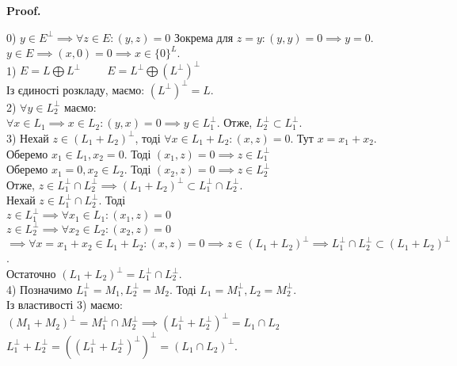 \documentclass[a4paper, 10pt]{article}
\makeatletter
\def\qed{$\blacksquare$}
\theoremstyle{theoremdd}
\theoremstyle{theoremdd}
\theoremstyle{theoremdd}
\theoremstyle{theoremdd}
\theoremstyle{theoremdd}
\theoremstyle{theoremdd}
\theoremstyle{theoremdd}
\theoremstyle{theoremdd}
\renewenvironment{proof}[1][Proof.\\]{\par
\pushQED{\hfill \qed}%
\normalfont \topsep6\p@\@plus6\p@\relax
\trivlist
\item\relax
{\bfseries
#1\@addpunct{.}}\hspace\labelsep\ignorespaces
}{%
\popQED\endtrivlist\@endpefalse
}
\makeatother
\begin{document}
\begin{proof}
0) $y \in E^{\perp} \implies \forall z \in E: (y,z) = 0$ Зокрема для $z = y: (y,y) = 0 \implies y = 0$.\\
$y \in E \implies (x,0) = 0 \implies x \in \{0\}^L$.
\bigskip \\
1) $E = L \bigoplus L^{\perp} \hspace{1cm} E = L^{\perp} \bigoplus (L^{\perp})^{\perp}$\\
Із єдиності розкладу, маємо: $(L^{\perp})^{\perp} = L$.
\bigskip \\
2) $\forall y \in L_2^{\perp}$ маємо:\\
$\forall x \in L_1 \implies x \in L_2: (y,x) = 0 \implies y \in L_1^{\perp}$. Отже, $L_2^{\perp} \subset L_1^{\perp}$.
\bigskip \\

3) Нехай $z \in (L_1+L_2)^\perp$, тоді $\forall x \in L_1+L_2: (x,z) = 0$. Тут $x = x_1 + x_2$. \\
Оберемо $x_1 \in L_1, x_2 = 0$. Тоді $(x_1,z) = 0 \implies z \in L_1^\perp$\\
Оберемо $x_1 = 0, x_2 \in L_2$. Тоді $(x_2,z) = 0 \implies z \in L_2^\perp$\\
Отже, $z \in L_1^\perp \cap L_2^\perp \implies (L_1+L_2)^\perp \subset L_1^\perp \cap L_2^\perp$.\\
Нехай $z \in L_1^\perp \cap L_2^\perp$. Тоді\\
$z \in L_1^\perp \implies \forall x_1 \in L_1: (x_1,z) = 0$\\
$z \in L_2^\perp \implies \forall x_2 \in L_2: (x_2,z) = 0$\\
$\implies \forall x = x_1+x_2 \in L_1+L_2: (x,z) = 0 \implies z \in (L_1+L_2)^\perp \implies L_1^\perp \cap L_2^\perp \subset (L_1+L_2)^\perp$.\\
Остаточно $(L_1+L_2)^{\perp} = L_1^{\perp} \cap L_2^{\perp}$.
\bigskip \\

\iffalse
3) $\forall z \in (L_1+L_2)^{\perp}: \forall x \in L_1, y \in L_2: x+y \in L_1+L_2: (z,x+y) = 0$\\
Тому $(z,x+y) = 0 \iff \begin{cases} (z,x) = 0 \\ (z,y) = 0 \end{cases} \iff \begin{cases} z \in L_1^{\perp} \\ z \in L_2^{\perp} \end{cases} \iff z \in L_1^{\perp} \cap L_2^{\perp}$
\fi

4) Позначимо $L_1^{\perp} = M_1, L_2^{\perp} = M_2$. Тоді $L_1 = M_1^{\perp}, L_2 = M_2^{\perp}$.\\
Із властивості 3) маємо:\\
$(M_1+M_2)^{\perp} = M_1^{\perp} \cap M_2^{\perp} \implies (L_1^{\perp} + L_2^{\perp})^{\perp} = L_1 \cap L_2$\\
$L_1^{\perp} + L_2^{\perp}=((L_1^{\perp} + L_2^{\perp})^{\perp})^{\perp} = (L_1 \cap L_2)^{\perp}$.
\end{proof}
\end{document}
